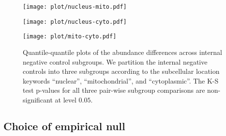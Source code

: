 \documentclass[a4paper,11pt]{article}
\theoremstyle{plain}
\theoremstyle{definition}
\theoremstyle{plain}
\newcommand{\nickname}{{\text{RANC}}}
\begin{document}
\begin{figure}[tbp]
    \centering
    \begin{minipage}{5cm}
    \centering
\texttt{[image: plot/nucleus-mito.pdf]}
    \end{minipage}
    \begin{minipage}{5cm}
    \centering
\texttt{[image: plot/nucleus-cyto.pdf]}
    \end{minipage}
        \begin{minipage}{5cm}
    \centering
\texttt{[image: plot/mito-cyto.pdf]}
    \end{minipage}
\caption{{Quantile-quantile plots of the abundance differences across internal negative control subgroups.
We partition the internal negative controls into three subgroups according to the subcellular location keywords ``nuclear'', ``mitochondrial'', and ``cytoplasmic''.
The K-S test p-values for all three pair-wise subgroup comparisons are non-significant at level $0.05$.
}}
    \label{fig:nc.subgroup}
\end{figure}


\subsection{Choice of empirical null}
\label{sec:choice-empir-null}
\end{document}
